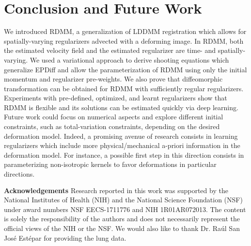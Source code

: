 \documentclass{article}
\numberwithin{equation}{section}
\begin{document}
\section{Conclusion and Future Work}
We introduced RDMM, a generalization of LDDMM registration which allows for spatially-varying regularizers advected with a deforming image. In RDMM, both the estimated velocity field and the estimated regularizer are time- and spatially-varying. We used a variational approach to derive shooting equations which generalize EPDiff and allow the parameterization of RDMM using only the initial momentum and regularizer pre-weights. We also prove that diffeomorphic transformation can be obtained for RDMM with sufficiently regular regularizers. Experiments with pre-defined, optimized, and learnt regularizers show that RDMM is flexible and its solutions can be estimated quickly via deep learning.\\
Future work could focus on numerical aspects and explore different initial constraints, such as total-variation constraints, depending on the desired deformation model. Indeed, a promising avenue of research consists in learning regularizers which include more physical/mechanical a-priori information in the deformation model. For instance, a possible first step in this direction consists in parameterizing non-isotropic kernels to favor deformations in particular directions. 

{\bf Acknowledgements} Research reported in this work was supported by the National Institutes of Health (NIH) and  the  National  Science  Foundation  (NSF)  under  award numbers  NSF  EECS-1711776  and  NIH  1R01AR072013. The content is solely the responsibility of the authors and does not necessarily represent the official views of the NIH or the NSF. We would also like to thank Dr. Ra\'ul San Jos\'e Est\'epar for providing the lung data. 
\end{document}
